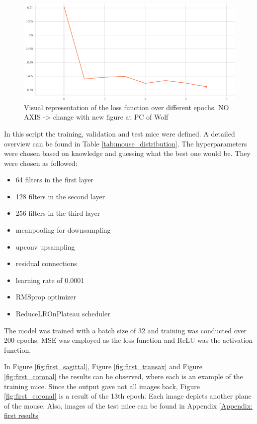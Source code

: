 \documentclass[twocolumn]{article}
\begin{document}
\begin{figure}
    \centering
    \includegraphics[width=1\linewidth]{First_results_loss.png}
    \caption{Visual representation of the loss function over different epochs. NO AXIS -> change with new figure at PC of Wolf}
    \label{fig:first_loss}
\end{figure}

In this script the training, validation and test mice were defined. A detailed overview can be found in Table \ref{tab:mouse_distribution}.
The hyperparameters were chosen based on knowledge and guessing what the best one would be. They were chosen as followed:
\begin{itemize}
    \item 64 filters in the first layer
    \item 128 filters in the second layer
    \item 256 filters in the third layer
    \item meanpooling for downsampling
    \item upconv upsampling
    \item residual connections
    \item learning rate of 0.0001
    \item RMSprop optimizer
    \item ReduceLROnPlateau scheduler
\end{itemize}
The model was trained with a batch size of 32 and training was conducted over 200 epochs. MSE was employed as the loss function and ReLU was the activation function.


In Figure \ref{fig:first_sagittal}, Figure \ref{fig:first_transax} and Figure \ref{fig:first_coronal} the results can be observed, where each is an example of the training mice. 
Since the output gave not all images back, Figure \ref{fig:first_coronal} is a result of the 13th epoch.
Each image depicts another plane of the mouse. Also, images of the test mice can be found in Appendix \ref{Appendix: first results}
\end{document}
